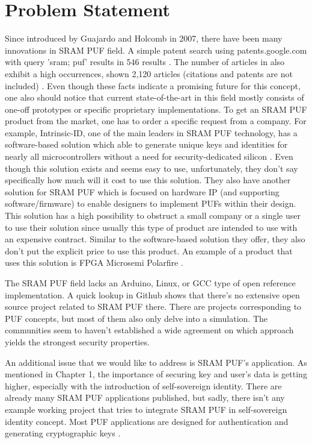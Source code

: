 \section{Problem Statement}


Since introduced by Guajardo and Holcomb in 2007, there have been many innovations in SRAM PUF field. A simple patent search using patents.google.com with query 'sram; puf' results in 546 results \cite{google_patents}. The number of articles in  also exhibit a high occurrences, shown 2,120 articles (citations and patents are not included) \cite{google_scholar}.
Even though these facts indicate a promising future for this concept, one also should notice that current state-of-the-art in this field mostly consists of one-off prototypes or specific proprietary implementations.
To get an SRAM PUF product from the market, one has to order a specific request from a company. For example, Intrinsic-ID, one of the main leaders in SRAM PUF technology, has a software-based solution which able to generate unique keys and identities for nearly all microcontrollers without a need for security-dedicated silicon \cite{broadkey}. Even though this solution exists and seems easy to use, unfortunately, they don't say specifically how much will it cost to use this solution.
They also have another solution for SRAM PUF which is focused on hardware IP (and supporting software/firmware) to enable designers to implement PUFs within their design. This solution has a high possibility to obstruct a small company or a single user to use their solution since usually this type of product are intended to use with an expensive contract. Similar to the software-based solution they offer, they also don't put the explicit price to use this product. An example of a product that uses this solution is FPGA Microsemi Polarfire \cite{polarfire}.

The SRAM PUF field lacks an Arduino, Linux, or GCC type of open reference implementation. A quick lookup in Github shows that there's no extensive open source project related to SRAM PUF there. There are projects corresponding to PUF concepts, but most of them also only delve into a simulation.
The communities seem to haven't established a wide agreement on which approach yields the strongest security properties.

An additional issue that we would like to address is SRAM PUF's application. As mentioned in Chapter 1, the importance of securing key and user's data is getting higher, especially with the introduction of self-sovereign identity. There are already many SRAM PUF applications published, but sadly, there isn't any example working project that tries to integrate SRAM PUF in self-sovereign identity concept. Most PUF applications are designed for authentication \cite{Tuyls2007} \cite{delvaux} \cite{Suh:2007:PUF:1278480.1278484} \cite{10.1007/978-3-642-04474-8_22} \cite{10.1007/978-3-642-10838-9_22} \cite{10.1007/978-3-319-29078-2_5}
and generating cryptographic keys \cite{Suh:2007:PUF:1278480.1278484} \cite{10.1007/978-3-642-33027-8_18}.

